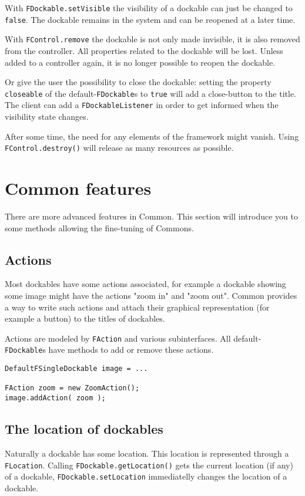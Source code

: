 \documentclass[a4paper,10pt]{article}
\newcommand{\src}[1]{\lstinline[basicstyle=\ttfamily]|#1|}
\begin{document}
With \src{FDockable.setVisible} the visibility of a dockable can just be changed to \src{false}. The dockable remains in the system and can be reopened at a later time.

With \src{FControl.remove} the dockable is not only made invisible, it is also removed from the controller. All properties related to the dockable will be lost. Unless added to a controller again, it is no longer possible to reopen the dockable.

Or give the user the possibility to close the dockable: setting the property \src{closeable} of the default-\src{FDockable}s to \src{true} will add a close-button to the title. The client can add a \src{FDockableListener} in order to get informed when the visibility state changes.

After some time, the need for any elements of the framework might vanish. Using \src{FControl.destroy()} will release as many resources as possible.

\section{Common features}
There are more advanced features in Common. This section will introduce you to some methods allowing the fine-tuning of Commons.

\subsection{Actions}
Most dockables have some actions associated, for example a dockable showing some image might have the actions "zoom in" and "zoom out". Common provides a way to write such actions and attach their graphical representation (for example a button) to the titles of dockables. 

Actions are modeled by \src{FAction} and various subinterfaces. All default-\src{FDockable}s have methods to add or remove these actions.

\begin{lstlisting}
DefaultFSingleDockable image = ...

FAction zoom = new ZoomAction();
image.addAction( zoom );
\end{lstlisting}


\subsection{The location of dockables}
Naturally a dockable has some location. This location is represented through a \src{FLocation}. Calling \src{FDockable.getLocation()} gets the current location (if any) of a dockable, \src{FDockable.setLocation} immediatelly changes the location of a dockable.
\end{document}
